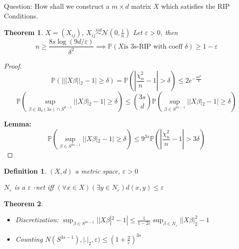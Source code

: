 \documentclass[11pt]{article}
\newtheorem{theorem}{Theorem}
\newtheorem{definition}{Definition}
\begin{document}
Question: How shall we construct a \(m \times d\) matrix \(X\) which satisfies the RIP Conditions.

\begin{theorem}
\(X = (X_{ij})\), \(X_{ij} \overset{iid}{\sim} \mathcal N(0, \frac1n)\)
Let \(\varepsilon > 0\), then
$$n \ge \frac{8s\log(9d/\varepsilon)}{\delta^2} \implies \mathbb P(X \text{is 3s-RIP with coeff } \delta) \ge 1 - \varepsilon$$
\end{theorem}

\begin{proof}
$$\mathbb P(| ||X\beta||_2 - 1| \ge \delta) = \mathbb P(|\frac{\chi_n^2}n - 1|>  \delta) \le 2 e^{-\frac{n\delta^2}{8}}$$
$$\mathbb P(\sup_{\beta \in B_0(3s) \cap S^{d-1}} |  |X\beta|_2 -1| \ge \delta) \le {3s \choose d} \mathbb P(\sup_{\beta \in S^{3s-1}} |  |X\beta|_2 -1| \ge \delta)$$

\textbf{Lemma:}
$$\mathbb P(\sup_{\beta \in S^{3s-1}} |  |X\beta|_2 -1| \ge \delta) \le 9^{3s} \mathbb P( |\frac{\chi_n^2}n - 1| > 3\delta)$$
\end{proof}

\begin{definition}
\((X, d)\) a metric space, \(\varepsilon > 0\)

\(N_{\varepsilon}\) is a \(\varepsilon\) -net iff \((\forall x \in X)( \exists y \in N_{\varepsilon}) d(x, y) \le \varepsilon\)
\label{orgspecialblock6}

\end{definition}

\begin{theorem}
\begin{itemize}
\item Discretization: \(\sup_{\beta \in S^{3s-1}} | |X\beta|^2 - 1| \le \frac{1}{1 - 2\varepsilon} \sup_{\beta \in N_{\varepsilon}} ||X\beta|_2^2 - 1\)
\item Counting \(N(S^{3s-1}), |.|_2, \varepsilon) \le (1 + \frac{2}{\varepsilon})^{3s}\)
\end{itemize}
\end{theorem}
\end{document}
